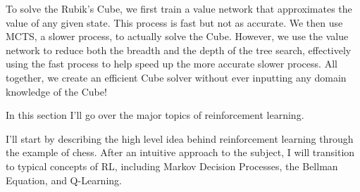 \documentclass[12pt,oneside,oldfontcommands]{memoir}
\theoremstyle{definition}
\begin{document}
\begin{Subsection}
To solve the Rubik's Cube, we first train a value network that approximates the value of any given state. This process is fast but not as accurate. We then use MCTS, a slower process, to actually solve the Cube. However, we use the value network to reduce both the breadth and the depth of the tree search, effectively using the fast process to help speed up the more accurate slower process. All together, we create an efficient Cube solver without ever inputting any domain knowledge of the Cube!
\end{Subsection}

\begin{Section}
In this section I'll go over the major topics of reinforcement learning. 

\tcblower 
I'll start by describing the high level idea behind reinforcement learning through the example of chess. After an intuitive approach to the subject, I will transition to typical concepts of RL, including Markov Decision Processes, the Bellman Equation, and Q-Learning. 
\end{Section}
\end{document}
